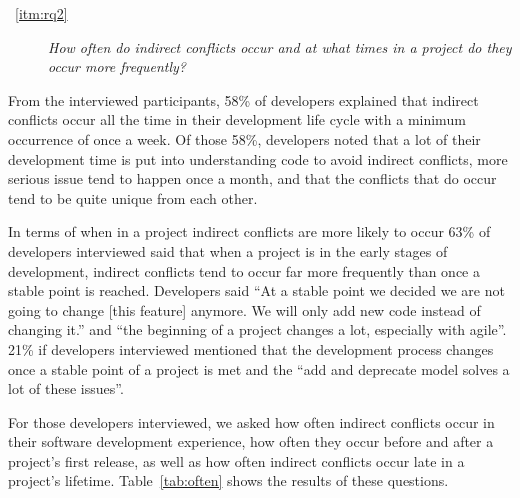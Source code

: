 \documentclass[conference]{IEEEtran}
\begin{document}
\begin{description}
	\item[~\ref{itm:rq2}] \textit{How often do indirect conflicts occur and at what times in a project do they occur more frequently?}
\end{description}

From the interviewed participants, 58\% of developers explained that indirect conflicts occur all the time in
their development life cycle with a minimum occurrence of once a week. Of those 58\%, developers noted that a
lot of their development time is put into understanding code to avoid indirect conflicts, more serious issue tend
to happen once a month, and that the conflicts that do occur tend to be quite unique from each other.

In terms of when in a project indirect conflicts are more likely to occur 63\% of developers interviewed said that
when a project is in the early stages of development, indirect conflicts tend to occur far more frequently
than once a stable point is reached. Developers said ``At a stable point we decided we are not going to change
[this feature] anymore. We will only add new code instead of changing it.'' and ``the beginning of a project 
changes a lot, especially with agile''. 21\% if developers interviewed mentioned that the development process
changes once a stable point of a project is met and the ``add and deprecate model solves a lot of these issues''.

For those developers interviewed, we asked how often indirect conflicts occur in their software development experience,
how often they occur before and after a project's first release, as well as how often indirect conflicts occur late
in a project's lifetime. Table~\ref{tab:often} shows the results of these questions.
\end{document}
